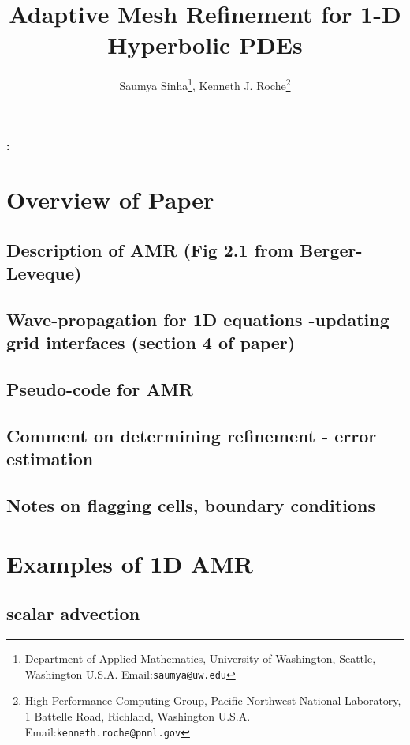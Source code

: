 \documentclass[12pt]{article}
\begin{document}
\title{\bf Adaptive Mesh Refinement for 1-D Hyperbolic PDEs}
\author{ 
Saumya Sinha\footnote{Department of Applied Mathematics, University of Washington, Seattle, Washington
U.S.A.
Email:\texttt{saumya@uw.edu}},
Kenneth J. Roche\footnote{
High Performance Computing Group, 
Pacific Northwest National Laboratory,
1 Battelle Road,
Richland, Washington 
U.S.A. 
Email:\texttt{kenneth.roche@pnnl.gov}} 
}
\maketitle


{\bf \abstractname{:}} {\small}

\newpage
\tableofcontents
\listoffigures
\listoftables
\newpage

\section{Overview of Paper}
\subsection{Description of AMR (Fig 2.1 from Berger-Leveque)}
\subsection{Wave-propagation for 1D equations -updating grid interfaces (section 4 of paper)}
\subsection{Pseudo-code for AMR}
\subsection{Comment on determining refinement - error estimation}
\subsection{Notes on flagging cells, boundary conditions}

\section{Examples of 1D AMR}
\subsection{scalar advection}
\end{document}
